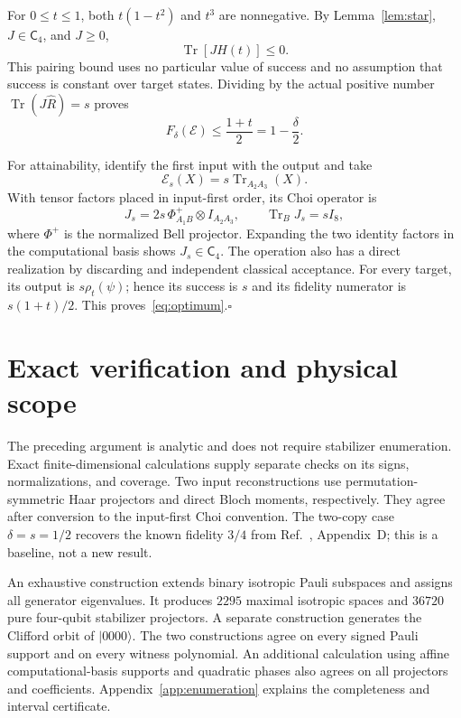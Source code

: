 \documentclass[aps,pra,reprint,amsmath,amssymb,longbibliography,nofootinbib]{revtex4-2}
\newcommand{\Tr}{\operatorname{Tr}}
\newcommand{\cE}{\mathcal E}
\newcommand{\Rh}{\widehat R}
\newcommand{\Cs}{\mathsf C}
\begin{document}
For $0\leq t\leq1$, both $t(1-t^2)$ and $t^3$ are nonnegative. By Lemma~\ref{lem:star}, $J\in\Cs_4$, and $J\geq0$,
\begin{equation}
 \Tr[JH(t)]\leq0.
 \label{eq:pairing}
\end{equation}
This pairing bound uses no particular value of success and no assumption that success is constant over target states. Dividing by the actual positive number $\Tr(J\Rh)=s$ proves
\begin{equation}
 F_\delta(\cE)\leq\frac{1+t}{2}=1-\frac{\delta}{2}.
 \label{eq:upper}
\end{equation}

For attainability, identify the first input with the output and take
\begin{equation}
 \cE_s(X)=s\Tr_{A_2A_3}(X).
 \label{eq:attainer}
\end{equation}
With tensor factors placed in input-first order, its Choi operator is
\begin{equation}
 J_s=2s\,\Phi^+_{A_1B}\otimes I_{A_2A_3},
 \qquad \Tr_BJ_s=sI_8,
 \label{eq:primal}
\end{equation}
where $\Phi^+$ is the normalized Bell projector. Expanding the two identity factors in the computational basis shows $J_s\in\Cs_4$. The operation also has a direct realization by discarding and independent classical acceptance. For every target, its output is $s\rho_t(\psi)$; hence its success is $s$ and its fidelity numerator is $s(1+t)/2$. This proves~\eqref{eq:optimum}.\hfill$\square$

\section{Exact verification and physical scope}
\label{sec:verification}

The preceding argument is analytic and does not require stabilizer enumeration. Exact finite-dimensional calculations supply separate checks on its signs, normalizations, and coverage. Two input reconstructions use permutation-symmetric Haar projectors and direct Bloch moments, respectively. They agree after conversion to the input-first Choi convention. The two-copy case $\delta=s=1/2$ recovers the known fidelity $3/4$ from Ref.~\cite{He2025NoGo}, Appendix~D; this is a baseline, not a new result.

An exhaustive construction extends binary isotropic Pauli subspaces and assigns all generator eigenvalues. It produces $2295$ maximal isotropic spaces and $36720$ pure four-qubit stabilizer projectors. A separate construction generates the Clifford orbit of $|0000\rangle$. The two constructions agree on every signed Pauli support and on every witness polynomial. An additional calculation using affine computational-basis supports and quadratic phases also agrees on all projectors and coefficients. Appendix~\ref{app:enumeration} explains the completeness and interval certificate.
\end{document}
